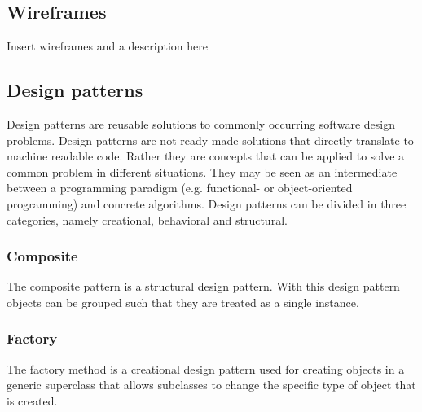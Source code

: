 \subsection{Wireframes}
Insert wireframes and a description here

\subsection{Design patterns}
Design patterns are reusable solutions to commonly occurring software design problems. Design patterns are not ready made solutions that directly translate to machine readable code. Rather they are concepts that can be applied to solve a common problem in different situations. They may be seen as an intermediate between a programming paradigm (e.g. functional- or object-oriented programming) and
concrete algorithms. Design patterns can be divided in three categories, namely creational, behavioral and structural.

\subsubsection{Composite}
The composite pattern is a structural design pattern. With this design pattern objects can be grouped such that they are treated as a
single instance.

\subsubsection{Factory}
The factory method is a creational design pattern used for creating objects in a generic superclass that allows subclasses to change the
specific type of object that is created.
